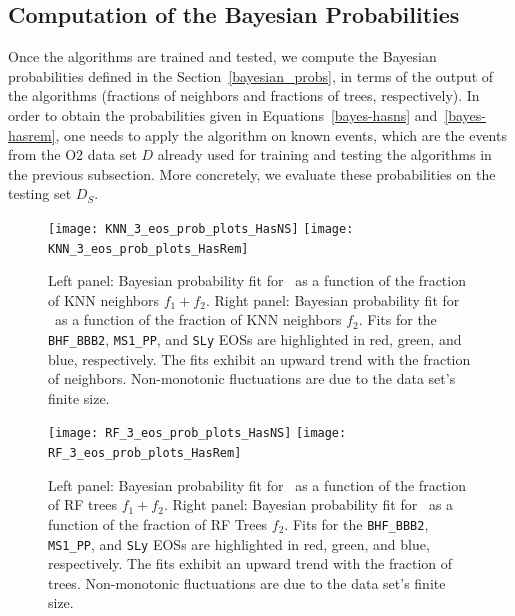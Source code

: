 \subsection{Computation of the Bayesian Probabilities}

Once the algorithms are trained and tested, we compute the Bayesian
probabilities defined in the Section~\ref{bayesian_probs}, in terms of the 
output of the algorithms (fractions of neighbors and fractions of trees, 
respectively). In order to obtain the probabilities given in 
Equations~\eqref{bayes-hasns} and~\eqref{bayes-hasrem}, one needs to apply
 the algorithm on known events, which are the events from the O2 data set $D$ already used for training and testing the algorithms in the previous subsection. More concretely, we evaluate these probabilities on the testing set $D_S$.

\begin{figure}%
\texttt{[image: KNN\_3\_eos\_prob\_plots\_HasNS]}
\texttt{[image: KNN\_3\_eos\_prob\_plots\_HasRem]}
\caption{Left panel: Bayesian probability fit for \hasns\ as a function of the fraction of \ac{KNN} neighbors $f_1+f_2$. Right panel: Bayesian probability fit for \hasrem\ as a function of the fraction of \ac{KNN} neighbors $f_2$. Fits for the {\tt BHF\_BBB2}, {\tt MS1\_PP}, and {\tt SLy} \ac{EOS}s are highlighted in red, green, and blue, respectively. The fits exhibit an upward trend with the fraction of neighbors.  Non-monotonic fluctuations are due to the data set's finite size.}
\label{fig:bayesian_prob_fits_KNN}
\end{figure}

\begin{figure}%
\texttt{[image: RF\_3\_eos\_prob\_plots\_HasNS]}
\texttt{[image: RF\_3\_eos\_prob\_plots\_HasRem]}
\caption{Left panel: Bayesian probability fit for \hasns\ as a function of the fraction of \ac{RF} trees $f_1+f_2$. Right panel: Bayesian probability fit for \hasrem\ as a function of the fraction of \ac{RF} Trees $f_2$. Fits for the {\tt BHF\_BBB2}, {\tt MS1\_PP}, and {\tt SLy} \ac{EOS}s are highlighted in red, green, and blue, respectively. The fits exhibit an upward trend with the fraction of trees.  Non-monotonic fluctuations are due to the data set's finite size.}
\label{fig:bayesian_prob_fits_RF}
\end{figure}

